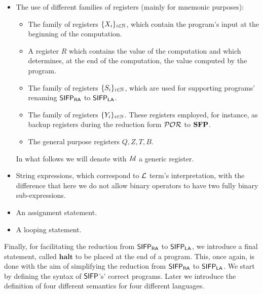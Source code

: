 \begin{itemize}
  \item The use of different families of registers (mainly for mnemonic purposes):
  \begin{itemize}
    \item The family of registers $\{X_i\}_{i \in \mathbb{N}}$, which contain the program's input at the
    beginning of the computation.
    \item A register $R$ which contains the value of the computation
    and which determines, at the end of the computation,
    the value computed by the program.
    \item The family of registers $\{S_i\}_{i \in \mathbb{N}}$, which are used
    for supporting programs' renaming $\mathsf{SIFP_{{\mathsf{RA}}}}$ to $\mathsf{SIFP_{{\mathsf{LA}}}}$.
    \item The family of registers $\{Y_i\}_{i \in \mathbb{N}}$. These
    registers employed, for instance,
    as backup registers during the reduction form $\mathcal{POR}$ to $\mathbf{SFP}$.
    \item The general purpose registers $Q, Z, T, B$.
  \end{itemize}
  \noindent
  In what follows we will denote with $\mathit{Id}$ a generic register.
  \item String expressions, which correspond to $\mathcal{L}$ term's interpretation,
  with the difference that here we do not allow binary operators to have
  two fully binary sub-expressions.
  \item An assignment statement.
  \item A looping statement.
\end{itemize}
%
%
Finally, for facilitating the reduction from $\mathsf{SIFP_{{\mathsf{RA}}}}$ to $\mathsf{SIFP_{{\mathsf{LA}}}}$,
we introduce a final statement, called $\mathbf{halt}$ to be placed at the end of a program.
This, once again, is done with the aim of simplifying
the reduction from $\mathsf{SIFP_{{\mathsf{RA}}}}$ to $\mathsf{SIFP_{{\mathsf{LA}}}}$.
%
%
We start by defining the syntax of $\mathsf{SIFP}$'s' correct programs.
Later we introduce
the definition of four different semantics for four different languages.


